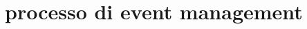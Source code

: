 %
%
\chapter[Processo di Event Management]{processo di event management}
\label{em}



%

%

%

%

%

%